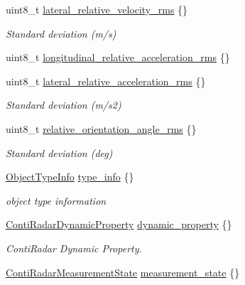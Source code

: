 \begin{DoxyCompactItemize}
uint8\+\_\+t \hyperlink{structmaf__perception__interface_1_1ContiRadarPerceptionObjectData_ab2716708efbec7766ab1e1a18a2a5f10}{lateral\+\_\+relative\+\_\+velocity\+\_\+rms} \{\}
\begin{DoxyCompactList}\small\item\em Standard deviation (m/s) \end{DoxyCompactList}\item 
uint8\+\_\+t \hyperlink{structmaf__perception__interface_1_1ContiRadarPerceptionObjectData_a62c86bd9a2b0a7e1f89c7709f76f67e9}{longitudinal\+\_\+relative\+\_\+acceleration\+\_\+rms} \{\}
\item 
uint8\+\_\+t \hyperlink{structmaf__perception__interface_1_1ContiRadarPerceptionObjectData_a1aaa113386ac5848521f39e5065cb118}{lateral\+\_\+relative\+\_\+acceleration\+\_\+rms} \{\}
\begin{DoxyCompactList}\small\item\em Standard deviation (m/s2) \end{DoxyCompactList}\item 
uint8\+\_\+t \hyperlink{structmaf__perception__interface_1_1ContiRadarPerceptionObjectData_a312ad9f3e3efbacbf3b12c82deb593bf}{relative\+\_\+orientation\+\_\+angle\+\_\+rms} \{\}
\begin{DoxyCompactList}\small\item\em Standard deviation (deg) \end{DoxyCompactList}\item 
\hyperlink{structmaf__perception__interface_1_1ObjectTypeInfo}{Object\+Type\+Info} \hyperlink{structmaf__perception__interface_1_1ContiRadarPerceptionObjectData_a9647e941c849af6283aa41749012a337}{type\+\_\+info} \{\}
\begin{DoxyCompactList}\small\item\em object type information \end{DoxyCompactList}\item 
\hyperlink{structmaf__perception__interface_1_1ContiRadarDynamicProperty}{Conti\+Radar\+Dynamic\+Property} \hyperlink{structmaf__perception__interface_1_1ContiRadarPerceptionObjectData_abfdb54b1a01f7892f5646086dddbf0a9}{dynamic\+\_\+property} \{\}
\begin{DoxyCompactList}\small\item\em Conti\+Radar Dynamic Property. \end{DoxyCompactList}\item 
\hyperlink{structmaf__perception__interface_1_1ContiRadarMeasurementState}{Conti\+Radar\+Measurement\+State} \hyperlink{structmaf__perception__interface_1_1ContiRadarPerceptionObjectData_a3b57e3d864e8c062a09c8b0eef98d7e4}{measurement\+\_\+state} \{\}

\end{DoxyCompactItemize}
